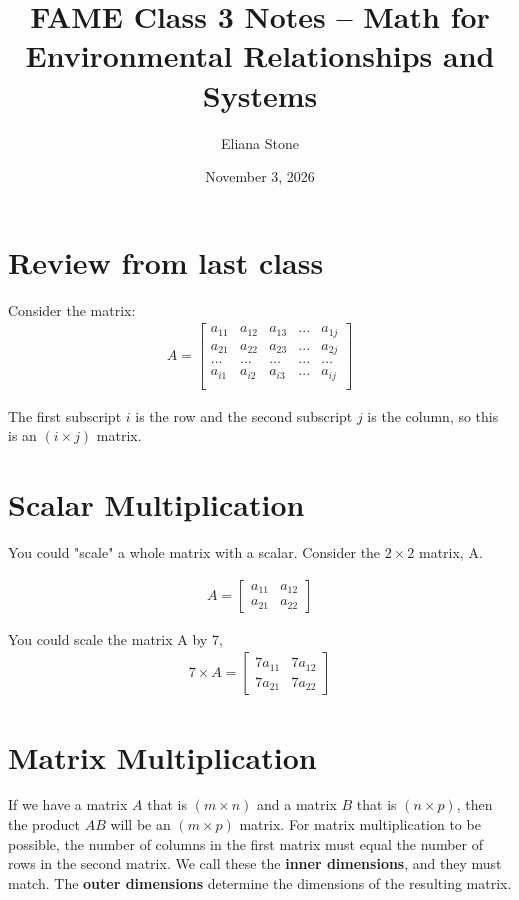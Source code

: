 \documentclass[12pt]{article}
\title{FAME Class 3 Notes -- Math for Environmental Relationships and Systems}
\author{Eliana Stone}
\date{November 3, 2026}
\begin{document}
\maketitle

\section{Review from last class}
Consider the matrix: 
\begin{align}
    A = \begin{bmatrix}
        a_{11} & a_{12} & a_{13} & ... & a_{1j}\\
        a_{21} & a_{22} & a_{23} & ... & a_{2j}\\
        ... & ... & ... & ... & ... \\
        a_{i1} & a_{i2} & a_{i3} & ... & a_{ij}\\
    \end{bmatrix}
\end{align}

The first subscript $i$ is the row and the second subscript $j$ is the column, so this is an $(i \times j)$ matrix. 

\section{Scalar Multiplication}
You could "scale" a whole matrix with a scalar. Consider the $2 \times 2$ matrix, A. 

\begin{align}
    A = \begin{bmatrix}
            a_{11} & a_{12} \\
            a_{21} & a_{22}
        \end{bmatrix}
\end{align}

You could scale the matrix A by 7, 
\begin{align}
    7 \times A = \begin{bmatrix}
            7 a_{11} & 7 a_{12} \\
            7 a_{21} & 7 a_{22}
        \end{bmatrix}
\end{align}


\section{Matrix Multiplication}
If we have a matrix $A$ that is $(m \times n)$ and a matrix $B$ that is $(n \times p)$, then the product $AB$ will be an $(m \times p)$ matrix. For matrix multiplication to be possible, the number of columns in the first matrix must equal the number of rows in the second matrix. We call these the \textbf{inner dimensions}, and they must match. The \textbf{outer dimensions} determine the dimensions of the resulting matrix.
\end{document}
